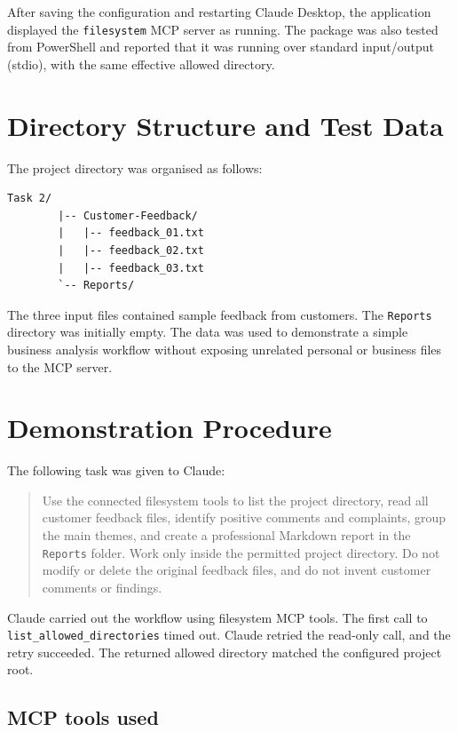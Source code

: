 \documentclass[12pt,a4paper]{article}
\begin{document}
	After saving the configuration and restarting Claude Desktop, the application displayed the \texttt{filesystem} MCP server as running. The package was also tested from PowerShell and reported that it was running over standard input/output (stdio), with the same effective allowed directory.
	
	\section{Directory Structure and Test Data}
	
	The project directory was organised as follows:
	\begin{lstlisting}[style=terminal]
		Task 2/
		|-- Customer-Feedback/
		|   |-- feedback_01.txt
		|   |-- feedback_02.txt
		|   |-- feedback_03.txt
		`-- Reports/
	\end{lstlisting}
	
	The three input files contained sample feedback from customers. The \texttt{Reports} directory was initially empty. The data was used to demonstrate a simple business analysis workflow without exposing unrelated personal or business files to the MCP server.
	
	\section{Demonstration Procedure}
	
	The following task was given to Claude:
	\begin{quote}
		Use the connected filesystem tools to list the project directory, read all customer feedback files, identify positive comments and complaints, group the main themes, and create a professional Markdown report in the \texttt{Reports} folder. Work only inside the permitted project directory. Do not modify or delete the original feedback files, and do not invent customer comments or findings.
	\end{quote}
	
	Claude carried out the workflow using filesystem MCP tools. The first call to \texttt{list\_allowed\_directories} timed out. Claude retried the read-only call, and the retry succeeded. The returned allowed directory matched the configured project root.
	
	\subsection{MCP tools used}
	
\end{document}
